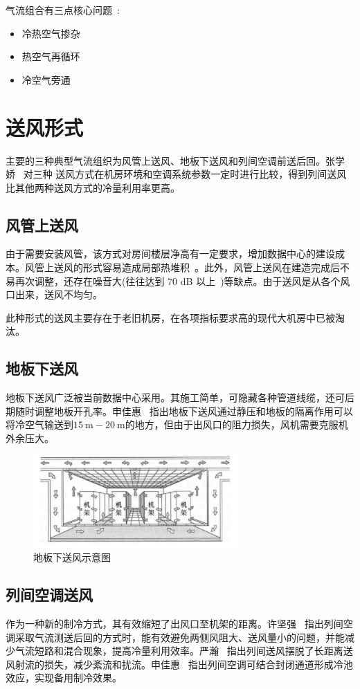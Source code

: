 \newpage
\noindent 气流组合有三点核心问题~\cite{16}:
\begin{itemize}
	\item 冷热空气掺杂
	\item 热空气再循环
	\item 冷空气旁通
\end{itemize}

\section{送风形式}
主要的三种典型气流组织为风管上送风、地板下送风和列间空调前送后回。张学娇~\cite{17} 对三种
送风方式在机房环境和空调系统参数一定时进行比较，得到列间送风比其他两种送风方式的冷量利用率更高。

\subsection{风管上送风}
由于需要安装风管，该方式对房间楼层净高有一定要求，增加数据中心的建设成本。风管上送风的形式容易造成局部热堆积~\cite{15}。此外，风管上送风在建造完成后不易再次调整，还存在噪音大(往往达到 70 dB 以上~\cite{19})等缺点。由于送风是从各个风口出来，送风不均匀。

此种形式的送风主要存在于老旧机房，在各项指标要求高的现代大机房中已被淘汰。
\subsection{地板下送风}
地板下送风广泛被当前数据中心采用。其施工简单，可隐藏各种管道线缆，还可后期随时调整地板开孔率。申佳惠~\cite{21} 指出地板下送风通过静压和地板的隔离作用可以将冷空气输送到$\qty{15}{\m}-\qty{20}{\m} $的地方，但由于出风口的阻力损失，风机需要克服机外余压大。

\begin{figure}[htbp]
	\centering
	\includegraphics[width=0.7\textwidth]{figure/figure_3.png}
	\caption{地板下送风示意图}
	\label{F:3}
\end{figure}

\subsection{列间空调送风}
作为一种新的制冷方式，其有效缩短了出风口至机架的距离。许坚强~\cite{18} 指出列间空调采取气流测送后回的方式时，能有效避免两侧风阻大、送风量小的问题，并能减少气流短路和混合现象，提高冷量利用效率。严瀚~\cite{20} 指出列间送风摆脱了长距离送风射流的损失，减少紊流和扰流。申佳惠~\cite{21} 指出列间空调可结合封闭通道形成冷池效应，实现备用制冷效果。

